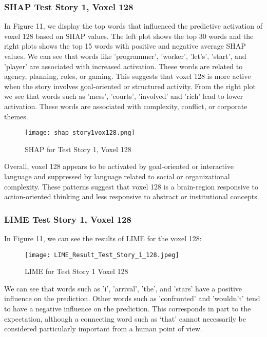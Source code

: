 \documentclass[12pt,letterpaper]{article}
\begin{document}
\subsubsection{SHAP Test Story 1, Voxel 128}
In Figure 11, we display the top words that influenced the predictive activation of voxel 128 based on SHAP values. The left plot shows the top 30 words and the right plots shows the top 15 words with positive and negative average SHAP values. 
We can see that words like 'programmer', 'worker', 'let's', 'start', and 'player' are associated with increased activation. These words are related to agency, planning, roles, or gaming. This suggests that voxel 128 is more active when the story involves goal-oriented or structured activity. From the right plot we see that words such as 'mess', 'courts', 'involved' and 'rich' lead to lower activation. These words are associated with complexity, conflict, or corporate themes. 

\begin{figure}[H]
    \centering
    \texttt{[image: shap\_story1vox128.png]}
    \caption{SHAP for Test Story 1, Voxel 128}
    \label{fig:enter-label}
\end{figure}

Overall, voxel 128 appears to be activated by goal-oriented or interactive language and suppressed by language related to social or organizational complexity. These patterns suggest that voxel 128 is a brain-region responsive to action-oriented thinking and less responsive to abstract or institutional concepts. 

\subsubsection{LIME Test Story 1, Voxel 128}
In Figure 11, we can see the results of LIME for the voxel 128:

\begin{figure}[H]
  \centering
  \texttt{[image: LIME\_Result\_Test\_Story\_1\_128.jpeg]}
  \caption{LIME for Test Story 1 Voxel 128}
  \label{fig:LIME1}
\end{figure}

We can see that words such as 'i', 'arrival', 'the', and 'stars' have a positive influence on the prediction. Other words such as 'confronted' and 'wouldn't' tend to have a negative influence on the prediction. This corresponds in part to the expectation, although a connecting word such as ‘that’ cannot necessarily be considered particularly important from a human point of view.
\end{document}
